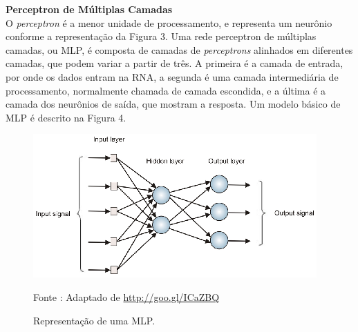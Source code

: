     \noindent
    \textbf{Perceptron de Múltiplas Camadas} \\ O \textit{perceptron} é a menor unidade de processamento, e representa um neurônio conforme a representação da Figura 3. Uma rede perceptron de múltiplas camadas, ou MLP, é composta de camadas de \textit{perceptrons} alinhados em diferentes camadas, que podem variar a partir de três. A primeira é a camada de entrada, por onde os dados entram na RNA, a segunda é uma camada intermediária de processamento, normalmente chamada de camada escondida, e a última é a camada dos neurônios de saída, que mostram a resposta. Um modelo básico de MLP é descrito na Figura 4.

    \begin{figure}[ht]
        \centering
        \label{fig04}
            \includegraphics[keepaspectratio=true, scale=2.1]{editaveis/images/mlp.eps}
        \caption{Representação de uma MLP.}
        Fonte : Adaptado de \url{http://goo.gl/ICaZBQ}
    \end{figure}


